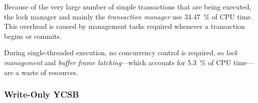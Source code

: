     Because of the very large number of simple transactions that are being executed, the lock manager and mainly the \emph{transaction manager} use \SI{34.47}{\percent} of CPU time. This overhead is caused by management tasks required whenever a transaction begins or commits.

    During single-threaded execution, no concurrency control is required, so \emph{lock management} and \emph{buffer frame latching}---which accounts for \SI{5.3}{\percent} of CPU time---are a waste of resources.

\subsubsection{Write-Only YCSB} \label{subsubsec:looking_glass_single_threaded_write_only_ycsb}

